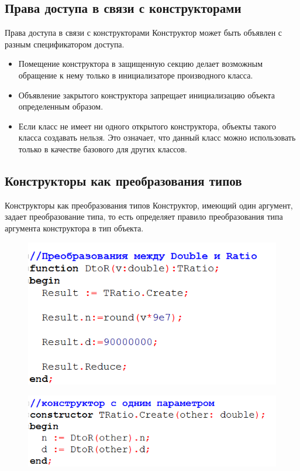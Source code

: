 \documentclass{beamer}
\begin{document}
\subsection{Права доступа в связи с конструкторами}
\begin{frame}{Права доступа в связи с конструкторами}
Конструктор может быть объявлен с разным спецификатором доступа.
\begin{itemize}
\item Помещение конструктора в защищенную секцию делает возможным обращение к нему только в инициализаторе производного класса. 
\item Объявление закрытого конструктора запрещает инициализацию объекта определенным образом. 
\item Если класс не имеет ни одного открытого конструктора, объекты такого класса создавать нельзя. Это означает, что данный класс можно использовать только в качестве базового для других классов.
\end{itemize}
\end{frame}

\subsection{Конструкторы как преобразования типов}
\begin{frame}{Конструкторы как преобразования типов}
Конструктор, имеющий один аргумент, задает преобразование типа, то есть определяет правило преобразования типа аргумента конструктора в тип объекта.
\begin{figure}[h]
\centering
\includegraphics[scale=0.4]{images/lec05-pic09.png}
\end{figure}
\begin{figure}[h]
\centering
\includegraphics[scale=0.4]{images/lec05-pic10.png}
\end{figure}
\end{frame}
\end{document}

